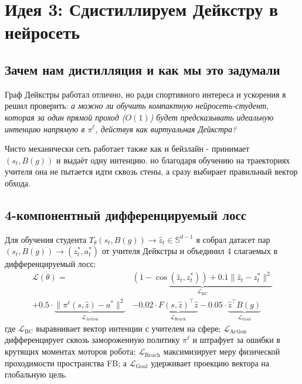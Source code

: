 \section{Идея 3: Сдистиллируем Дейкстру в нейросеть}

\subsection{Зачем нам дистилляция и как мы это задумали}

Граф Дейкстры работал отлично, но ради спортивного интереса и ускорения я решил проверить: \textit{а можно ли обучить компактную нейросеть-студент, которая за один прямой проход ($O(1)$) будет предсказывать идеальную интенцию напрямую в $\pi^\ell$, действуя как виртуальная Дейкстра?}

Чисто механически сеть работает также как и бейзлайн - принимает $(s_t, B(g))$ и выдаёт одну интенцию.  но благодаря обучению на траекториях учителя она не пытается идти сквозь стены, а сразу выбирает правильный вектор обхода.

\subsection{4-компонентный дифференцируемый лосс}

Для обучения студента $T_\theta(s_t, B(g)) \to \hat{z}_t \in \mathbb{S}^{d-1}$ я собрал датасет пар $(s_t, B(g)) \to (z^*_t, a^*_t)$ от учителя Дейкстры и объединил 4 слагаемых в дифференцируемый лосс:
\begin{equation}
\label{eq:distillation_loss}
\begin{split}
\mathcal{L}(\theta) = {} & \underbrace{(1 - \cos(\hat{z}_t, z^*_t)) + 0.1 \|\hat{z}_t - z^*_t\|^2}_{\mathcal{L}_{\text{BC}}} \\ + 0.5 \cdot \underbrace{\|\pi^\ell(s, \hat{z}) - a^*\|^2}_{\mathcal{L}_{\text{Action}}} 
& - 0.02 \cdot \underbrace{F(s, \hat{z})^\top \hat{z}}_{\mathcal{L}_{\text{Reach}}} - 0.05 \cdot \underbrace{\hat{z}^\top B(g)}_{\mathcal{L}_{\text{Goal}}}
\end{split}
\end{equation}
где $\mathcal{L}_{\text{BC}}$ выравнивает вектор интенции с учителем на сфере; $\mathcal{L}_{\text{Action}}$ дифференцирует сквозь замороженную политику $\pi^\ell$ и штрафует за ошибки в крутящих моментах моторов робота; $\mathcal{L}_{\text{Reach}}$ максимизирует меру физической проходимости пространства FB; а $\mathcal{L}_{\text{Goal}}$ удерживает проекцию вектора на глобальную цель.

